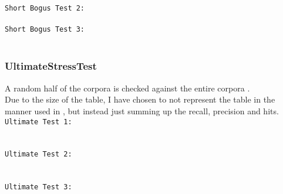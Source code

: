 \begin{description}
\texttt{Short Bogus Test 2:}\\
\\

\texttt{Short Bogus Test 3:}\\
\\

\clearpage
\subsubsection{UltimateStressTest}
A random half of the corpora is checked against the entire corpora .\\
Due to the size of the table, I have chosen to not represent the table in the manner used in \cite{nr4}, but instead just summing up the recall, precision and hits.\\

\texttt{Ultimate Test 1:}\\\\
\\

\clearpage
\texttt{Ultimate Test 2:}\\\\
\\

\clearpage
\texttt{Ultimate Test 3:}\\\\
\\

\end{description}

